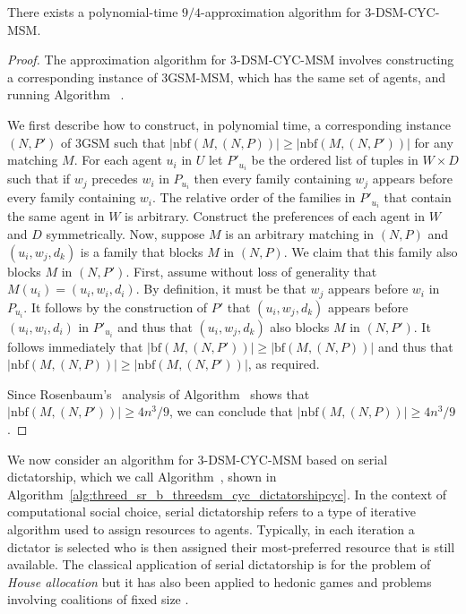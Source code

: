 \begin{thm}
\label{thm:three_dsm_cyc_ninefour}
There exists a polynomial-time $9/4$-approximation algorithm for 3-DSM-CYC-MSM.
\end{thm}
\begin{proof}
The approximation algorithm for 3-DSM-CYC-MSM involves constructing a corresponding instance of 3GSM-MSM, which has the same set of agents, and running Algorithm~ \cite{rosenbaum16}.

We first describe how to construct, in polynomial time, a corresponding instance $(N, P')$ of 3GSM such that $|\textrm{nbf}(M, (N, P))| \geq |\textrm{nbf}(M, (N, P'))|$ for any matching $M$. For each agent $u_i$ in $U$ let $P'_{u_i}$ be the ordered list of tuples in $W \times D$ such that if $w_j$ precedes $w_i$ in $P_{u_i}$ then every family containing $w_j$ appears before every family containing $w_i$. The relative order of the families in $P'_{u_i}$ that contain the same agent in $W$ is arbitrary. Construct the preferences of each agent in $W$ and $D$ symmetrically. Now, suppose $M$ is an arbitrary matching in $(N, P)$ and $(u_i, w_j, d_k)$ is a family that blocks $M$ in $(N, P)$. We claim that this family also blocks $M$ in $(N, P')$. First, assume without loss of generality that $M(u_i) = (u_i, w_i, d_i)$. By definition, it must be that $w_j$ appears before $w_i$ in $P_{u_i}$. It follows by the construction of $P'$ that $(u_i, w_j, d_k)$ appears before $(u_i, w_i, d_i)$ in $P'_{u_i}$ and thus that $(u_i, w_j, d_k)$ also blocks $M$ in $(N, P')$. It follows immediately that $|\textrm{bf}(M, (N, P'))| \geq |\textrm{bf}(M, (N, P))|$ and thus that $|\textrm{nbf}(M, (N, P))| \geq |\textrm{nbf}(M, (N, P'))|$, as required.

Since Rosenbaum's~\cite{rosenbaum16} analysis of  Algorithm~ shows that $|\textrm{nbf}(M, (N, P'))| \geq 4n^3/9$, we can conclude that $|\textrm{nbf}(M, (N, P))| \geq 4n^3/9$.
\end{proof}

We now consider an algorithm for 3-DSM-CYC-MSM based on serial dictatorship, which we call Algorithm~, shown in Algorithm~\ref{alg:threed_sr_b_threedsm_cyc_dictatorshipcyc}. In the context of computational social choice, serial dictatorship refers to a type of iterative algorithm used to assign resources to agents. Typically, in each iteration a dictator is selected who is then assigned their most-preferred resource that is still available. The classical application of serial dictatorship is for the problem of \emph{House allocation} \cite{HedonicGamesHOCSC} but it has also been applied to hedonic games \cite{ABS11} and problems involving coalitions of fixed size \cite{CSEH2019}.

